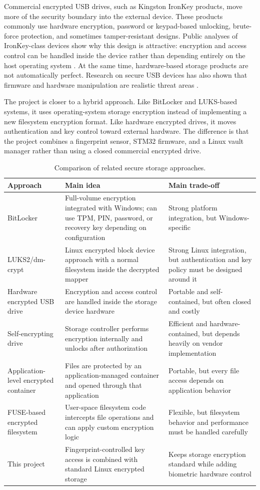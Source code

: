 Commercial encrypted USB drives, such as Kingston IronKey products, move more of the security boundary into the external device. These products commonly use hardware encryption, password or keypad-based unlocking, brute-force protection, and sometimes tamper-resistant designs. Public analyses of IronKey-class devices show why this design is attractive: encryption and access control can be handled inside the device rather than depending entirely on the host operating system \cite{skorobogatovIronKey}. At the same time, hardware-based storage products are not automatically perfect. Research on secure USB devices has also shown that firmware and hardware manipulation are realistic threat areas \cite{swierczynskiHardwareTrojan}.

The project is closer to a hybrid approach. Like BitLocker and LUKS-based systems, it uses operating-system storage encryption instead of implementing a new filesystem encryption format. Like hardware encrypted drives, it moves authentication and key control toward external hardware. The difference is that the project combines a fingerprint sensor, STM32 firmware, and a Linux vault manager rather than using a closed commercial encrypted drive.

\begin{table}[!htbp]
\centering
\caption{\label{tab:solutions}Comparison of related secure storage approaches.}
\small
\begin{tabularx}{\textwidth}{lXX}
\toprule
Approach & Main idea & Main trade-off\\
\midrule
BitLocker & Full-volume encryption integrated with Windows; can use TPM, PIN, password, or recovery key depending on configuration & Strong platform integration, but Windows-specific\\
LUKS2/dm-crypt & Linux encrypted block device approach with a normal filesystem inside the decrypted mapper & Strong Linux integration, but authentication and key policy must be designed around it\\
Hardware encrypted USB drive & Encryption and access control are handled inside the storage device hardware & Portable and self-contained, but often closed and costly\\
Self-encrypting drive & Storage controller performs encryption internally and unlocks after authorization & Efficient and hardware-contained, but depends heavily on vendor implementation\\
Application-level encrypted container & Files are protected by an application-managed container and opened through that application & Portable, but every file access depends on application behavior\\
FUSE-based encrypted filesystem & User-space filesystem code intercepts file operations and can apply custom encryption logic & Flexible, but filesystem behavior and performance must be handled carefully\\
This project & Fingerprint-controlled key access is combined with standard Linux encrypted storage & Keeps storage encryption standard while adding biometric hardware control\\
\bottomrule
\end{tabularx}
\end{table}

